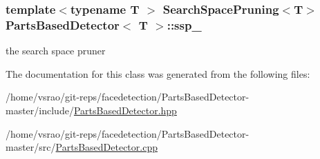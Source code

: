 \hypertarget{classPartsBasedDetector_aae91c693f9d01e3e6cbd552d7f81e474}{
\subsubsection[{ssp\-\_\-}]{\setlength{\rightskip}{0pt plus 5cm}template$<$typename T $>$ {\bf Search\-Space\-Pruning}$<$T$>$ {\bf Parts\-Based\-Detector}$<$ T $>$\-::ssp\-\_\-\hspace{0.3cm}{\ttfamily [private]}}}\label{classPartsBasedDetector_aae91c693f9d01e3e6cbd552d7f81e474}


the search space pruner 



The documentation for this class was generated from the following files\-:\begin{DoxyCompactItemize}
\item 
/home/vsrao/git-\/reps/facedetection/\-Parts\-Based\-Detector-\/master/include/\hyperlink{PartsBasedDetector_8hpp}{Parts\-Based\-Detector.\-hpp}\item 
/home/vsrao/git-\/reps/facedetection/\-Parts\-Based\-Detector-\/master/src/\hyperlink{PartsBasedDetector_8cpp}{Parts\-Based\-Detector.\-cpp}\end{DoxyCompactItemize}
